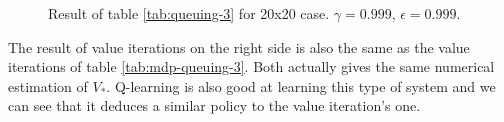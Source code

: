 \documentclass[
  a4paper, xcolor = usenames,dvipsnames]{article}
\theoremstyle{definition}
\theoremstyle{definition}
\theoremstyle{definition}
\theoremstyle{definition}
\theoremstyle{remark}
\begin{document}
\begin{figure}

{\centering {}

}

\caption{Result of table \ref{tab:queuing-3} for 20x20 case. \(\gamma = 0.999\), \(\epsilon = 0.999\).}\label{fig:20x20-queuing-3}
\end{figure}

The result of value iterations on the right side is also the same as the value iterations of table \ref{tab:mdp-queuing-3}. Both actually gives the same numerical estimation of \(V_{*}\). Q-learning is also good at learning this type of system and we can see that it deduces a similar policy to the value iteration's one.

\newpage

\printbibliography
\end{document}
